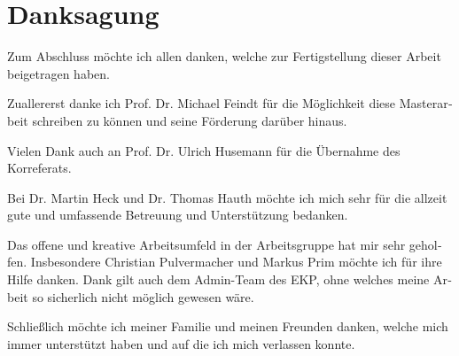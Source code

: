 \chapter*{Danksagung}
\begin{otherlanguage}{ngerman}
Zum Abschluss möchte ich allen danken, welche zur Fertigstellung dieser Arbeit beigetragen haben.

Zuallererst danke ich Prof. Dr. Michael Feindt für die Möglichkeit diese Masterarbeit schreiben zu können und seine Förderung darüber hinaus.

Vielen Dank auch an Prof. Dr. Ulrich Husemann für die Übernahme des Korreferats.

Bei Dr. Martin Heck und Dr. Thomas Hauth möchte ich mich sehr für die allzeit gute und umfassende Betreuung und Unterstützung bedanken.

Das offene und kreative Arbeitsumfeld in der Arbeitsgruppe hat mir sehr geholfen. Insbesondere Christian Pulvermacher und Markus Prim möchte ich für ihre Hilfe danken. Dank gilt auch dem Admin-Team des EKP, ohne welches meine Arbeit so sicherlich nicht möglich gewesen wäre.

Schließlich möchte ich meiner Familie und meinen Freunden danken, welche mich immer unterstützt haben und auf die ich mich verlassen konnte.
\end{otherlanguage}
